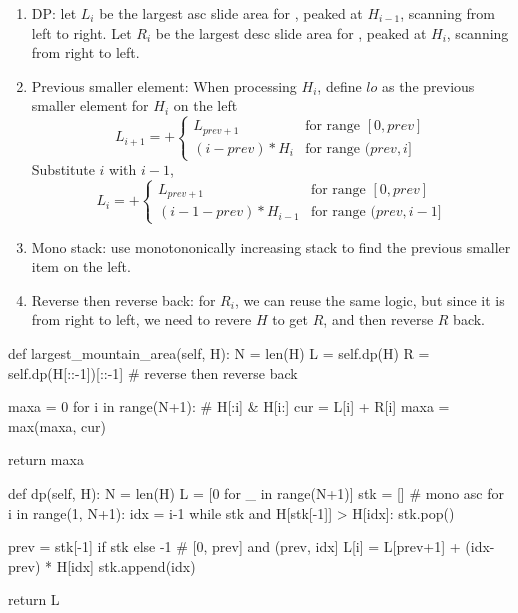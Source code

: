 \begin{enumerate}
\item DP: let $L_i$ be the largest asc slide area for , peaked at $H_{i-1}$, scanning from left to right. Let $R_i$ be the largest desc slide area for , peaked at $H_i$, scanning from right to left. 
\item Previous smaller element: When processing $H_i$, define $lo$ as the previous smaller element for $H_i$ on the left
\[
    L_{i+1} =+
    \begin{cases}
        L_{prev+1} & \text{for range }[0,prev]\\
        (i-prev) * H_{i} &\text{for range }(prev, i]
    \end{cases}
\]
Substitute $i$ with $i-1$, 
\[
    L_{i} =+
    \begin{cases}
        L_{prev+1} & \text{for range }[0,prev]\\
        (i-1-prev) * H_{i-1} &\text{for range }(prev, i-1]
    \end{cases}
\]

\item Mono stack: use monotononically increasing stack to find the previous smaller item on the left. 
\item Reverse then reverse back: for $R_i$, we can reuse the same logic, but since it is from right to left, we need to revere $H$ to get $R$, and then reverse $R$ back.
\end{enumerate}
\begin{python}
def largest_mountain_area(self, H):
    N = len(H)
    L = self.dp(H)
    R = self.dp(H[::-1])[::-1] # reverse then reverse back
    
    maxa = 0
    for i in range(N+1):
    	# H[:i] & H[i:]
        cur = L[i] + R[i]
        maxa = max(maxa, cur)

    return maxa

def dp(self, H):
    N = len(H)
    L = [0 for _ in range(N+1)]
    stk = []  # mono asc
    for i in range(1, N+1):
        idx = i-1
        while stk and H[stk[-1]] > H[idx]:
            stk.pop()
            
        prev = stk[-1] if stk else -1
        # [0, prev] and (prev, idx]
        L[i] = L[prev+1] + (idx-prev) * H[idx] 
        stk.append(idx)
    
    return L
\end{python}

